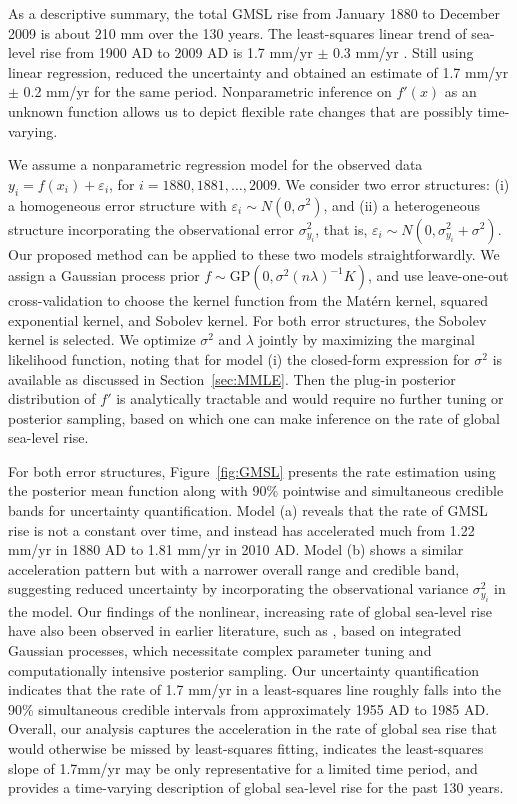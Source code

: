 \documentclass[12pt]{article}
\newcommand{\GP}{\mathrm{GP}}
\theoremstyle{plain}
\theoremstyle{nonitalicremark}
\begin{document}
As a descriptive summary, the total GMSL rise from January 1880 to December 2009 is about 210 mm over the 130 years. The least-squares linear trend of sea-level rise from 1900 AD to 2009 AD is 1.7 mm/yr $\pm$ 0.3 mm/yr \citep{church200620th}. Still using linear regression, \cite{church2011sea} reduced the uncertainty and obtained an estimate of 1.7 mm/yr $\pm$ 0.2 mm/yr for the same period. Nonparametric inference on $f'(x)$ as an unknown function allows us to depict flexible rate changes that are possibly time-varying. 

We assume a nonparametric regression model for the observed data $y_i = f(x_i) + \varepsilon_i$, for $i = 1880, 1881, \ldots, 2009$. We consider two error structures: (i) a homogeneous error structure with $\varepsilon_i \sim N(0, \sigma^2)$, and (ii) a heterogeneous structure incorporating the observational error $\sigma^2_{y_i}$, that is, $\varepsilon_i \sim N(0, \sigma^2_{y_i}+\sigma^2)$. Our proposed method can be applied to these two models straightforwardly. We assign a Gaussian process prior $f \sim \GP(0, \sigma^2 (n \lambda)^{-1} K)$, and use leave-one-out cross-validation to choose the kernel function from the Mat\'ern kernel, squared exponential kernel, and Sobolev kernel. For both error structures, the Sobolev kernel is selected. We optimize $\sigma^2$ and $\lambda$ jointly by maximizing the marginal likelihood function, noting that for model (i) the closed-form expression for $\sigma^2$ is available as discussed in Section~\ref{sec:MMLE}. Then the plug-in posterior distribution of $f'$ is analytically tractable and would require no further tuning or posterior sampling, based on which one can make inference on the rate of global sea-level rise.



For both error structures, Figure~\ref{fig:GMSL} presents the rate estimation using the posterior mean function along with 90\% pointwise and simultaneous credible bands for uncertainty quantification. Model (a) reveals that the rate of GMSL rise is not a constant over time, and instead has accelerated much from 1.22 mm/yr in 1880 AD to 1.81 mm/yr in 2010 AD. Model (b) shows a similar acceleration pattern but with a narrower overall range and credible band, suggesting reduced uncertainty by incorporating the observational variance $\sigma_{y_i}^2$ in the model. Our findings of the nonlinear, increasing rate of global sea-level rise have also been observed in earlier literature, such as \cite{cahill2015modeling}, based on integrated Gaussian processes, which necessitate complex parameter tuning and computationally intensive posterior sampling. Our uncertainty quantification indicates that the rate of 1.7 mm/yr in a least-squares line roughly falls into the 90\% simultaneous credible intervals from approximately 1955 AD to 1985 AD. Overall, our analysis captures the acceleration in the rate of global sea rise that would otherwise be missed by least-squares fitting, indicates the least-squares slope of 1.7mm/yr may be only representative for a limited time period, and provides a time-varying description of global sea-level rise for the past 130 years. 
\end{document}
